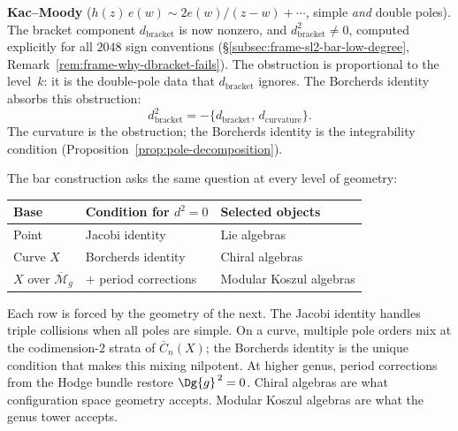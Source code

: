 \smallskip\noindent\textbf{Kac--Moody} ($h(z)\,e(w) \sim
2e(w)/(z-w) + \cdots$, simple \emph{and} double poles).
The bracket component $d_{\mathrm{bracket}}$ is now nonzero, and
$d_{\mathrm{bracket}}^2 \neq 0$, computed explicitly for all
$2048$ sign conventions
(\S\ref{subsec:frame-sl2-bar-low-degree},
Remark~\ref{rem:frame-why-dbracket-fails}). The obstruction is
proportional to the level~$k$: it is the double-pole data that
$d_{\mathrm{bracket}}$ ignores. The Borcherds identity absorbs
this obstruction:
\[
d_{\mathrm{bracket}}^2
= -\{d_{\mathrm{bracket}},\, d_{\mathrm{curvature}}\}.
\]
The curvature is the obstruction; the Borcherds identity is the
integrability condition
(Proposition~\ref{prop:pole-decomposition}).

\begin{remark}
\label{rem:classical-vs-chiral-selection}
The bar construction asks the same question at every level
of geometry:
\begin{center}
\small
\begin{tabular}{lll}
\textbf{Base} & \textbf{Condition for $d^2 = 0$}
 & \textbf{Selected objects} \\
\hline
Point & Jacobi identity & Lie algebras \\
Curve $X$ & Borcherds identity & Chiral algebras \\
$X$ over $\overline{\mathcal{M}}_g$ & $+$ period corrections
 & Modular Koszul algebras
\end{tabular}
\end{center}
Each row is forced by the geometry of the next. The Jacobi
identity handles triple collisions when all poles are simple.
On a curve, multiple pole orders mix at the codimension-$2$
strata of $\overline{C}_n(X)$; the Borcherds identity is
the unique condition that makes this mixing nilpotent. At
higher genus, period corrections from the Hodge bundle restore
$\Dg{g}^{\,2} = 0$. Chiral algebras are what configuration
space geometry accepts. Modular Koszul algebras are what the
genus tower accepts.
\end{remark}

